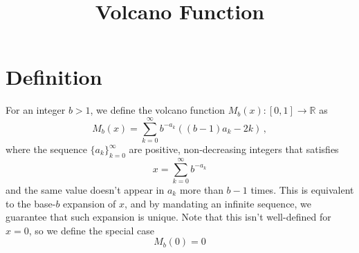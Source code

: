 \documentclass[]{article}
\title{Volcano Function}
\begin{document}
\maketitle
\section{Definition}
For an integer $b > 1$, we define the volcano function $M_b(x): [0, 1] \to \mathbb{R}$ as
\[
M_b(x) = \sum_{k=0}^\infty b^{-a_k}((b-1)a_k-2k)\,,
\]
where the sequence $\{a_k\}_{k=0}^{\infty}$ are positive, non-decreasing integers that satisfies
\[
x = \sum_{k=0}^\infty b^{-a_k}
\]
and the same value doesn't appear in $a_k$ more than $b-1$ times. This is equivalent to the base-$b$ expansion of $x$, and by mandating an infinite sequence, we guarantee that such expansion is unique. Note that this isn't well-defined for $x=0$, so we define the special case
\[
M_b(0) = 0
\]
\end{document}
